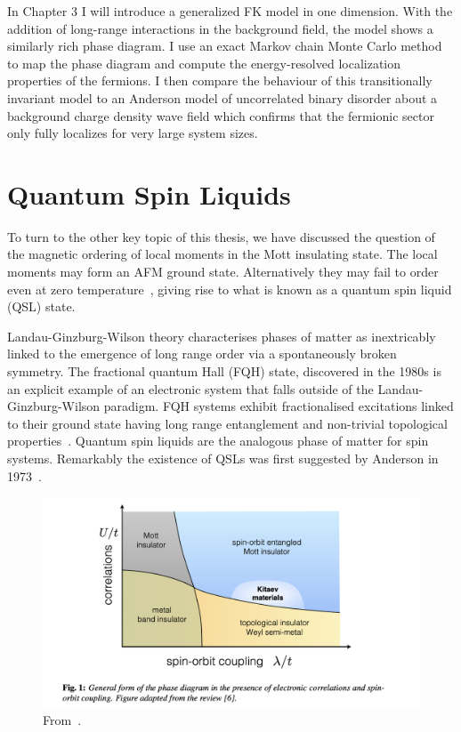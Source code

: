 In Chapter 3 I will introduce a generalized FK model in one dimension. With the addition of long-range interactions in the background field, the model shows a similarly rich phase diagram. I use an exact Markov chain Monte Carlo method to map the phase diagram and compute the energy-resolved localization properties of the fermions. I then compare the behaviour of this transitionally invariant model to an Anderson model of uncorrelated binary disorder about a background charge density wave field which confirms that the fermionic sector only fully localizes for very large system sizes.

\hypertarget{quantum-spin-liquids}{%
\section{Quantum Spin Liquids}\label{quantum-spin-liquids}}

To turn to the other key topic of this thesis, we have discussed the question of the magnetic ordering of local moments in the Mott insulating state. The local moments may form an AFM ground state. Alternatively they may fail to order even at zero temperature~\autocite{law1TTaS2QuantumSpin2017,ribakGaplessExcitationsGround2017}, giving rise to what is known as a quantum spin liquid (QSL) state.

Landau-Ginzburg-Wilson theory characterises phases of matter as inextricably linked to the emergence of long range order via a spontaneously broken symmetry. The fractional quantum Hall (FQH) state, discovered in the 1980s is an explicit example of an electronic system that falls outside of the Landau-Ginzburg-Wilson paradigm. FQH systems exhibit fractionalised excitations linked to their ground state having long range entanglement and non-trivial topological properties~\autocite{broholmQuantumSpinLiquids2020}. Quantum spin liquids are the analogous phase of matter for spin systems. Remarkably the existence of QSLs was first suggested by Anderson in 1973~\autocite{andersonResonatingValenceBonds1973}.

\hypertarget{fig:correlation_spin_orbit_PT}{%
\begin{figure}
\centering
\includegraphics[width=1\textwidth,height=\textheight]{figure_code/intro_chapter/correlation_spin_orbit_PT.png}
\caption[{Phase Diagram}]{From~\autocite{TrebstPhysRep2022}.}
\label{fig:correlation_spin_orbit_PT}
\end{figure}
}

